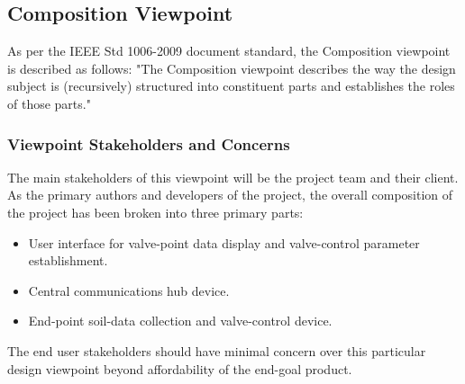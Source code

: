 \documentclass[onecolumn, draftclsnofoot,10pt, compsoc]{IEEEtran}
\begin{document}
	\subsection{Composition Viewpoint}
	As per the IEEE Std 1006-2009 document standard, the Composition viewpoint is described as follows: "The Composition viewpoint describes the way the design subject is (recursively) structured into constituent parts and establishes the roles of those parts."
	\subsubsection{Viewpoint Stakeholders and Concerns}
	The main stakeholders of this viewpoint will be the project team and their client.
	As the primary authors and developers of the project, the overall composition of the project has been broken into three primary parts:
	\begin{itemize}
		\item User interface for valve-point data display and valve-control parameter establishment.
		\item Central communications hub device.
		\item End-point soil-data collection and valve-control device.
	\end{itemize}
	The end user stakeholders should have minimal concern over this particular design viewpoint beyond affordability of the end-goal product.
\end{document}
